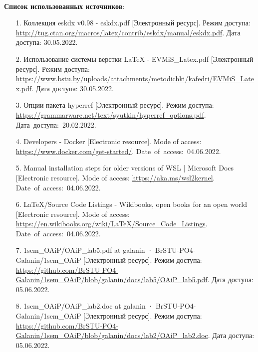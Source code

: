 \documentclass[12pt, a4paper, simple]{eskdtext}
\begin{document}
\newpage
\paragraph{} \textbf{Список использованных источников}:
\begin{enumerate}
    \item[1.] Коллекция eskdx v0.98 - eskdx.pdf
    [Электронный ресурс].
    Режим доступа: \url{http://tug.ctan.org/macros/latex/contrib/eskdx/manual/eskdx.pdf}.
    Дата доступа: 30.05.2022.

    \item[2.] Использование системы верстки LaTeX - EVMiS\_Latex.pdf
    [Электронный ресурс].
    Режим доступа: \url{https://www.bstu.by/uploads/attachments/metodichki/kafedri/EVMiS_Latex.pdf}.
    Дата доступа: 30.05.2022.

    \item[3.] Опции пакета hyperref
    [Электронный ресурс].
    Режим доступа: \url{https://grammarware.net/text/syutkin/hyperref_options.pdf}.
    Дата~доступа:~20.02.2022.

    \item[4.] Developers - Docker
    [Electronic resource].
    Mode of access: \url{https://www.docker.com/get-started/}.
    Date~of~access:~04.06.2022.

    \item[5.] Manual installation steps for older versions of WSL | Microsoft Docs
    [Electronic resource].
    Mode of access: \url{https://aka.ms/wsl2kernel}.
    Date~of~access:~04.06.2022.

    \item[6.] LaTeX/Source Code Listings - Wikibooks, open books for an open world
    [Electronic resource].
    Mode of access: \url{https://en.wikibooks.org/wiki/LaTeX/Source_Code_Listings}.
    Date~of~access:~04.06.2022.

    \item[7.] 1sem\_OAiP/OAiP\_lab5.pdf at galanin · BrSTU-PO4-Galanin/1sem\_OAiP
    [Электронный ресурс].
    Режим доступа: \url{https://github.com/BrSTU-PO4-Galanin/1sem_OAiP/blob/galanin/docs/lab5/OAiP_lab5.pdf}.
    Дата доступа: 05.06.2022.

    \item[8.] 1sem\_OAiP/OAiP\_lab2.doc at galanin · BrSTU-PO4-Galanin/1sem\_OAiP
    [Электронный ресурс].
    Режим доступа: \url{https://github.com/BrSTU-PO4-Galanin/1sem_OAiP/blob/galanin/docs/lab2/OAiP_lab2.doc}.
    Дата доступа: 05.06.2022.
\end{enumerate}

\newpage
\end{document}
